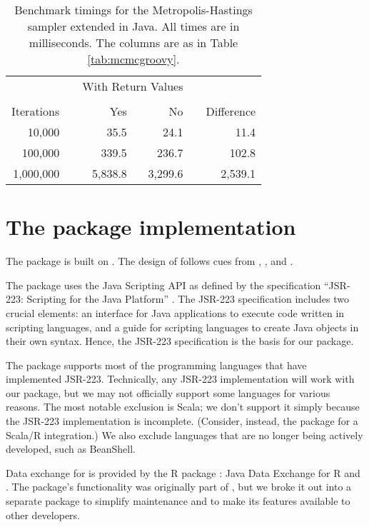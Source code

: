 \begin{table}[h]
\centering
\caption{Benchmark timings for the Metropolis-Hastings sampler extended in Java. All times are in milliseconds. The columns are as in Table \ref{tab:mcmcgroovy}.}
\begin{tabular}{rrrrrr}
\toprule
& & \multicolumn{2}{c}{With Return Values} & & \\
\cline{3-4} \\[-8pt]
Iterations & & \multicolumn{1}{r}{Yes} & \multicolumn{1}{r}{No} & & Difference \\ \midrule
10,000 & & 35.5 & 24.1 & & 11.4 \\
100,000 & & 339.5 & 236.7 & & 102.8 \\
1,000,000 & & 5,838.8 & 3,299.6 & & 2,539.1 \\ \bottomrule
\end{tabular}
\label{tab:mcmcjava}
\end{table}

\hypertarget{the-jsr223-package-implementation}{}
\section{The  package implementation}

The  package is built on . The design of  follows cues from ,  \citep{rscala}, and  \citep{v8pkg}.

The  package uses the Java Scripting API \citep{jsa} as defined by the specification “JSR-223: Scripting for the Java Platform” \citep{jsr223spec}. The JSR-223 specification includes two crucial elements: an interface for Java applications to execute code written in scripting languages, and a guide for scripting languages to create Java objects in their own syntax. Hence, the JSR-223 specification is the basis for our package.

The  package supports most of the programming languages that have implemented JSR-223. Technically, any JSR-223 implementation will work with our package, but we may not officially support some languages for various reasons. The most notable exclusion is Scala; we don't support it simply because the JSR-223 implementation is incomplete. (Consider, instead, the  package for a Scala/R integration.) We also exclude languages that are no longer being actively developed, such as BeanShell.

Data exchange for  is provided by the R package : Java Data Exchange for R and  \citep{jdx}. The  package's functionality was originally part of , but we broke it out into a separate package to simplify maintenance and to make its features available to other developers. %

